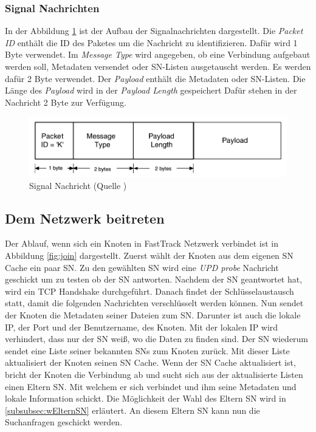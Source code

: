 \subsubsection{Signal Nachrichten}
\label{subsubsec:sigN}

In der Abbildung \ref{fig:sigN} ist der Aufbau der Signalnachrichten dargestellt.
Die \textit{Packet ID} enthält die ID des Paketes um die Nachricht zu identifizieren.
Dafür wird 1 Byte verwendet.
Im \textit{Message Type} wird angegeben, ob eine Verbindung aufgebaut werden soll, Metadaten versendet oder SN-Listen ausgetauscht werden.
Es werden dafür 2 Byte verwendet.
Der \textit{Payload} enthält die Metadaten oder SN-Listen.
Die Länge des \textit{Payload} wird in der \textit{Payload Length} gespeichert
Dafür stehen in der Nachricht 2 Byte zur Verfügung.

\begin{figure}
\includegraphics[scale=0.25]{gfx/signal_message}
\caption{Signal Nachricht (Quelle \cite{liang2006fasttrack})}
\label{fig:sigN}
\end{figure}

\subsection{Dem Netzwerk beitreten}
\label{subsec:join}

Der Ablauf, wenn sich ein Knoten in FastTrack Netzwerk verbindet ist in Abbildung \ref{fig:join} dargestellt.
Zuerst wählt der Knoten aus dem eigenen SN Cache ein paar SN.
Zu den gewählten SN wird eine \textit{UPD probe} Nachricht geschickt um zu testen ob der SN antworten.
Nachdem der SN geantwortet hat, wird ein TCP Handshake durchgeführt. 
Danach findet der Schlüsselaustausch statt, damit die folgenden Nachrichten verschlüsselt werden können.
Nun sendet der Knoten die Metadaten seiner Dateien zum SN.
Darunter ist auch die lokale IP, der Port und der Benutzername, des Knoten.
Mit der lokalen IP wird verhindert, dass nur der SN weiß, wo die Daten zu finden sind.
Der SN wiederum sendet eine Liste seiner bekannten SNs zum Knoten zurück.
Mit dieser Liste aktualisiert der Knoten seinen SN Cache.
Wenn der SN Cache aktualisiert ist, bricht der Knoten die Verbindung ab und sucht sich aus der aktualisierte Listen einen Eltern SN. 
Mit welchem er sich verbindet und ihm seine Metadaten und lokale Information schickt.
Die Möglichkeit der Wahl des Eltern SN wird in \ref{subsubsec:wElternSN} erläutert.
An diesem Eltern SN kann nun die Suchanfragen geschickt werden.

